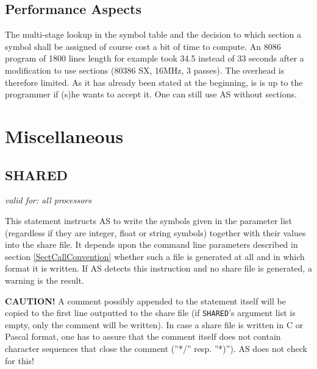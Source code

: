 \documentclass[12pt,twoside]{report}
\makeatletter
\newcommand{\bb}[1]{{\bf #1}}
\newcommand{\tty}[1]{{\tt #1}}
\newcommand{\ttindex}[1]{\index{#1@{\tt #1}}}
\newcommand{\asname}{{AS}}
\makeatother
\begin{document}

\subsection{Performance Aspects}

The multi-stage lookup in the symbol table and the decision to which
section a symbol shall be assigned of course cost a bit of time to
compute.  An 8086 program of 1800 lines length for example took 34.5
instead of 33 seconds after a modification to use sections (80386 SX,
16MHz, 3 passes).  The overhead is therefore limited.  As it has
already been stated at the beginning, is is up to the programmer if
(s)he wants to accept it.  One can still use \asname{} without sections.


\section{Miscellaneous}


\subsection{SHARED}
\label{ChapShareOrder}
\ttindex{SHARED}

{\em valid for: all processors}

This statement instructs \asname{} to write the symbols given in the
parameter list (regardless if they are integer, float or string
symbols) together with their values into the share file.  It depends
upon the command line parameters described in section
\ref{SectCallConvention} whether such a file is generated at all and in
which format it is written.  If \asname{} detects this instruction and no share
file is generated, a warning is the result.

\bb{CAUTION!}  A comment possibly appended to the statement itself will be
copied to the first line outputted to the share file (if \tty{SHARED}'s
argument list is empty, only the comment will be written).  In case a
share file is written in C or Pascal format, one has to assure that
the comment itself does not contain character sequences that close
the comment (''*/'' resp. ''*)'').  \asname{} does not check for this!
\end{document}
